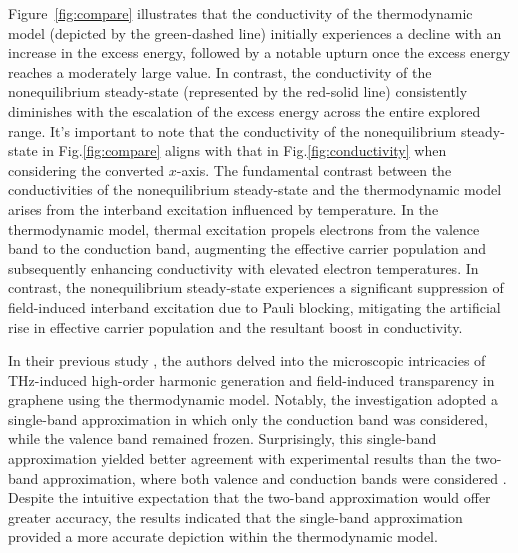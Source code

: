 Figure~\ref{fig:compare} illustrates that the conductivity of the thermodynamic model (depicted by the green-dashed line) initially experiences a decline with an increase in the excess energy, followed by a notable upturn once the excess energy reaches a moderately large value. In contrast, the conductivity of the nonequilibrium steady-state (represented by the red-solid line) consistently diminishes with the escalation of the excess energy across the entire explored range. It's important to note that the conductivity of the nonequilibrium steady-state in Fig.\ref{fig:compare} aligns with that in Fig.\ref{fig:conductivity} when considering the converted $x$-axis. The fundamental contrast between the conductivities of the nonequilibrium steady-state and the thermodynamic model arises from the interband excitation influenced by temperature. In the thermodynamic model, thermal excitation propels electrons from the valence band to the conduction band, augmenting the effective carrier population and subsequently enhancing conductivity with elevated electron temperatures. In contrast, the nonequilibrium steady-state experiences a significant suppression of field-induced interband excitation due to Pauli blocking, mitigating the artificial rise in effective carrier population and the resultant boost in conductivity.

In their previous study \cite{mics2015thermodynamic}, the authors delved into the microscopic intricacies of THz-induced high-order harmonic generation and field-induced transparency in graphene using the thermodynamic model. Notably, the investigation adopted a single-band approximation in which only the conduction band was considered, while the valence band remained frozen. Surprisingly, this single-band approximation yielded better agreement with experimental results than the two-band approximation, where both valence and conduction bands were considered \cite{kovalev2021electrical}. Despite the intuitive expectation that the two-band approximation would offer greater accuracy, the results indicated that the single-band approximation provided a more accurate depiction within the thermodynamic model.

